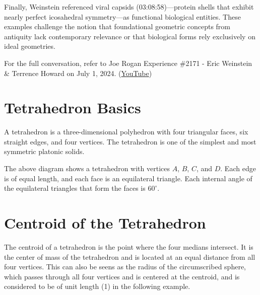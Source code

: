 \documentclass[a4paper,12pt]{article}
\begin{document}
Finally, Weinstein referenced viral capsids (03:08:58)—protein shells that exhibit nearly perfect icosahedral symmetry—as functional biological entities. These examples challenge the notion that foundational geometric concepts from antiquity lack contemporary relevance or that biological forms rely exclusively on ideal geometries.

For the full conversation, refer to Joe Rogan Experience \#2171 - Eric Weinstein \& Terrence Howard on July 1, 2024. (\href{https://www.youtube.com/watch?v=nrOaFxNex7U}{YouTube})


\section{Tetrahedron Basics}
A tetrahedron is a three-dimensional polyhedron with four triangular faces, six straight edges, and four vertices. The tetrahedron is one of the simplest and most symmetric platonic solids.

\begin{center}
\end{center}

\noindent
The above diagram shows a tetrahedron with vertices \( A \), \( B \), \( C \), and \( D \). Each edge is of equal length, and each face is an equilateral triangle. Each internal angle of the equilateral triangles that form the faces is \( 60^\circ \).


\section{Centroid of the Tetrahedron}
The centroid of a tetrahedron is the point where the four medians intersect. It is the center of mass of the tetrahedron and is located at an equal distance from all four vertices. This can also be seens as the radius of the circumscribed sphere, which passes through all four vertices and is centered at the centroid, and is considered to be of unit length (1) in the following example.
\end{document}
